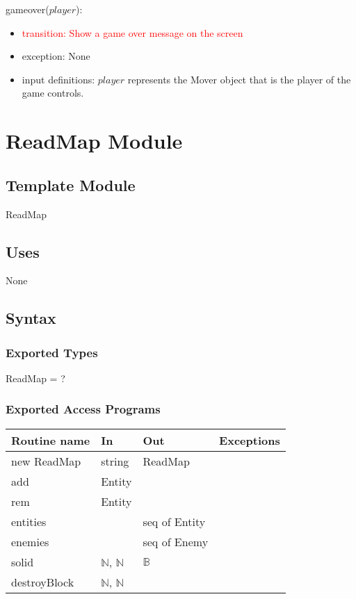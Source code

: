 \documentclass[12pt]{article}
\begin{document}
\noindent gameover($player$):
\begin{itemize}
    \item \textcolor{red}{transition: Show a game over message on the screen}
    \item exception: None
    \item input definitions: $player$ represents the Mover object that is the player of the game controls.
\end{itemize}

\newpage

\section*{ReadMap Module}

\subsection*{Template Module}

ReadMap

\subsection*{Uses}

None

\subsection*{Syntax}

\subsubsection*{Exported Types}

ReadMap = ?

\subsubsection*{Exported Access Programs}

\begin{tabular}{| l | l | l | l |}
\hline
\textbf{Routine name} & \textbf{In} & \textbf{Out} & \textbf{Exceptions}\\
\hline
new ReadMap & string & ReadMap & ~\\
\hline
add & Entity & ~ & \textcolor{red}{~}\\
\hline
rem & Entity & ~ & \textcolor{red}{~}\\
\hline
entities & ~ & seq of Entity & ~\\
\hline
enemies & ~ & seq of Enemy & ~\\
\hline
solid & $\mathbb{N}$, $\mathbb{N}$ & $\mathbb{B}$ & ~\\
\hline
destroyBlock & $\mathbb{N}$, $\mathbb{N}$ & ~ & \textcolor{red}{~}\\
\hline
\end{tabular}
\end{document}

